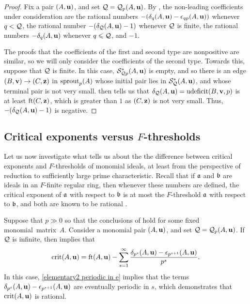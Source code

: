 \documentclass[11pt]{amsart}
\newcommand{\udeficit}{\operatorname{udeficit}}
\renewcommand{\S}{\mathcal{S}}
\begin{document}
\begin{proof}
   Fix a pair $(A,\mathbf{u})$, and set $\mathcal{Q}=\mathcal{Q}_p(A,\mathbf{u})$.
   By , the non-leading coefficients under consideration are the rational numbers $-(\delta_{q}(A,\mathbf{u})-\epsilon_{qp}(A,\mathbf{u}))$ whenever $q < \mathcal{Q}$, the rational number $-(\delta_{\mathcal{Q}}(A,\mathbf{u}) - 1)$ whenever $\mathcal{Q}$ is finite, the rational numbers $-\delta_q(A,\mathbf{u})$ whenever $q\leqslant \mathcal{Q}$, and $-1$.

   The proofs that the coefficients of the first and second type are nonpositive are similar, so we will only consider the coefficients of the second type.
   Towards this, suppose that $\mathcal{Q}$ is finite.
   In this case, $\S^{\ast}_{\Q p}(A,\vv{u})$ is empty, and so there is an edge $(B,\mathbf{v}) \to (C,\mathbf{z})$ in $\operatorname{sprout}_p(A)$ whose initial pair lies in $\S^{\ast}_{\Q}(A,\vv{u})$, and whose terminal pair is not very small.  then tells us that $\delta_{\Q}(A,\vv{u}) = \udeficit(B,\vv{v},p)$ is at least $\operatorname{ft}(C, \mathbf{z})$, which is greater than $1$ as $(C,\mathbf{z})$ is not very small.
   Thus, $-(\delta_{\mathcal{Q}}(A,\mathbf{u})-1)$ is negative.
\end{proof}

\subsection{Critical exponents versus $F$-thresholds}
\label{crit versus ft: SS}

Let us now investigate what  tells us about the the difference between critical exponents and $F$-thresholds of monomial ideals, at least from the perspective of reduction to sufficiently large prime characteristic.  
Recall that if $\mathfrak{a}$ and $\mathfrak{b}$ are ideals in an $F$-finite regular ring, then whenever these numbers are defined, the critical exponent of $\mathfrak{a}$ with respect to $\mathfrak{b}$ is at most the $F$-threshold $\mathfrak{a}$ with respect to $\mathfrak{b}$, and both are known to be rational \cite[Corollary~5.8]{hernandez+etal.frobenius_powers}.  

Suppose that $p \gg 0$ so that the conclusions of  hold for some fixed monomial~matrix~$A$.  Consider a monomial pair $(A,\mathbf{u})$, and set  $\mathcal{Q} = \mathcal{Q}_p(A,\mathbf{u})$.
If $\mathcal{Q}$ is infinite, then   implies that
\begin{equation}\label{eq: crit infinite case}
\operatorname{crit}(A,\mathbf{u})=\operatorname{ft}(A, \mathbf{u}) - \sum_{s=1}^{\infty} \frac{\delta_{p^s}(A,\mathbf{u})-\epsilon_{p^{s+1}}(A,\mathbf{u})}{p^s}. 
\end{equation}
In this case, \eqref{elementary2 periodic in e} implies that the terms $\delta_{p^s}(A,\mathbf{u})-\epsilon_{p^{s+1}}(A,\mathbf{u})$ are eventually periodic in $s$, which demonstrates that $\operatorname{crit}(A,\mathbf{u})$ is rational.
\end{document}
